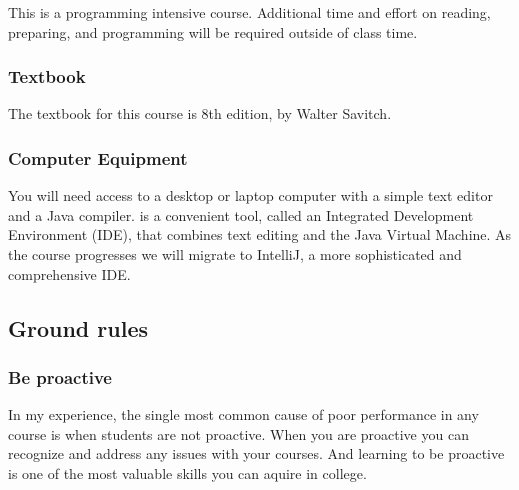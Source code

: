 \documentclass[letterpaper,10pt,english]{sphinxmanual}
\begin{document}
This  is a programming intensive course. Additional time and effort on reading, preparing, and programming will be required outside of class time.


\subsubsection{Textbook}
\label{\detokenize{COMP170/organization:textbook}}
The textbook for this course is  8th edition, by Walter Savitch.


\subsubsection{Computer Equipment}
\label{\detokenize{COMP170/organization:computer-equipment}}
You will need access to a desktop or laptop computer with a simple text editor and a Java compiler.  is a convenient tool, called an Integrated Development Environment (IDE), that combines text editing and the Java Virtual Machine. As the course progresses we will migrate to IntelliJ, a more sophisticated and comprehensive IDE.


\subsection{Ground rules}
\label{\detokenize{COMP170/organization:ground-rules}}

\subsubsection{Be proactive}
\label{\detokenize{COMP170/organization:be-proactive}}
In my experience, the single most common cause of poor performance in any course is when students are not proactive. When you are proactive you can recognize and address any issues with your courses. And learning to be proactive is one of the most valuable skills you can aquire in college.
\end{document}
